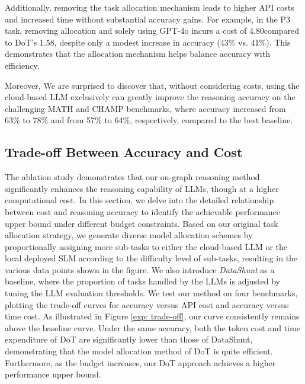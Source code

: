 Additionally, removing the task allocation mechanism leads to higher API costs and increased time without substantial accuracy gains. For example, in the P3 task, removing allocation and solely using GPT-4o incurs a cost of 4.80\textcent compared to DoT’s 1.58\textcent, despite only a modest increase in accuracy (43\% vs. 41\%). This demonstrates that the allocation mechanism helps balance accuracy with efficiency.


Moreover, We are surprised to discover that, without considering costs, using the cloud-based LLM exclusively can greatly improve the reasoning accuracy on the challenging MATH and CHAMP benchmarks, where accuracy increased from 63\% to 78\% and from 57\% to 64\%, respectively, compared to the best baseline.


\vspace{-3mm}
\subsection{Trade-off Between Accuracy and Cost}

The ablation study demonstrates that our on-graph reasoning method significantly enhances the reasoning capability of LLMs, though at a higher computational cost. In this section, we delve into the detailed relationship between cost and reasoning accuracy to identify the achievable performance upper bound under different budget constraints. 
Based on our original task allocation strategy, we generate diverse model allocation schemes by proportionally assigning more sub-tasks to either the cloud-based LLM or the local deployed SLM according to the difficulty level of sub-tasks, resulting in the various data points shown in the figure. 
We also introduce \textit{DataShunt} as a baseline, where the proportion of tasks handled by the LLMs is adjusted by tuning the LLM evaluation thresholds. 
We test our method on four benchmarks, plotting the trade-off curves for accuracy versus API cost and accuracy versus time cost. 
As illustrated in Figure \ref{exp: trade-off}, our curve consistently remains above the baseline curve. Under the same accuracy, both the token cost and time expenditure of DoT are significantly lower than those of DataShunt, demonstrating that the model allocation method of DoT is quite efficient. Furthermore, as the budget increases, our DoT approach achieves a higher performance upper bound.


